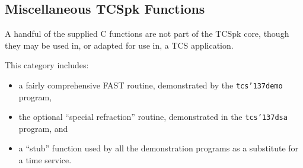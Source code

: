 \documentclass[12pt,fleqn,twoside]{article}
\renewcommand{\_}{{\tt\char'137}}     %
\begin{document}
\newpage
\fi

\subsection{Miscellaneous TCSpk Functions}

A handful of the supplied C functions are not part of the TCSpk core,
though they may be used in, or adapted for use in, a TCS application.

This category includes:
\begin{itemize}
\item a fairly comprehensive FAST routine, demonstrated
      by the {\tt tcs\_demo} program,
\item the optional ``special refraction'' routine,
      demonstrated in the {\tt tcs\_dsa} program, and
\item a ``stub'' function used by all the demonstration programs
      as a substitute for a time service.
      \end{itemize}
\end{document}
